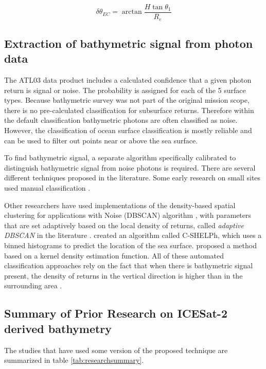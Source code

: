 \begin{equation}
      \delta \theta_{EC} = \arctan{\frac{H \tan{\theta_1}}{R_e}}
\end{equation}


\subsection{Extraction of bathymetric signal from photon data}\label{subsec:signal-finding}
The ATL03 data product includes a calculated confidence that a given photon return is signal or noise. The probability is assigned for each of the 5 surface types. Because bathymetric survey was not part of the original mission scope, there is no pre-calculated classification for subsurface returns. Therefore within the default classification bathymetric photons are often classified as noise. However, the classification of ocean surface classification is mostly reliable \parencite{} and can be used to filter out points near or above the sea surface.

To find bathymetric signal, a separate algorithm specifically calibrated to distinguish bathymetric signal from noise photons is required. There are several different techniques proposed in the literature. Some early research on small sites used manual classification \parencite{Forfinski-Sarkozi2016,Thomas2021d,Babbel2021a,Albright2021}.

Other researchers have used implementations of the density-based spatial clustering for applications with Noise (DBSCAN) algorithm \parencite{Ester1996}, with parameters that are set adaptively based on the local density of returns, called \emph{adaptive DBSCAN} in the literature \parencite{Ma2020,Xie2021,LeQuilleuc2022b,Liu2021}.  \citeauthor{Thomas2022} created an algorithm called C-SHELPh, which uses a binned histograms to predict the location of the sea surface. \cite{Datta2021} proposed a method based on a kernel density estimation function. All of these automated classification approaches rely on the fact that when there is bathymetric signal present, the density of returns in the vertical direction is higher than in the surrounding area \parencite{Neuenschwander2019}.


\subsection{Summary of Prior Research on ICESat-2 derived bathymetry} %

The studies that have used some version of the proposed technique are summarized in table \ref{tab:researchsummary}.

